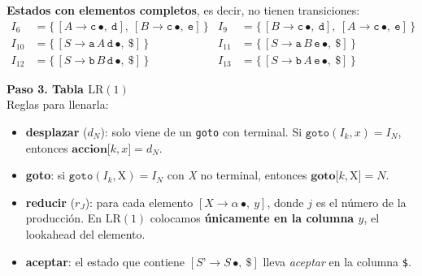 \documentclass[12pt,letterpaper]{article}
\newcommand{\nt}[1]{\textit{#1}}
\newcommand{\tk}[1]{\texttt{#1}}
\newcommand{\tx}[1]{\text{#1}}
\newcommand{\lr}{\mathrm{LR(1)}}
\begin{document}
\begin{enumerate}[label=\arabic*.]
  \medskip

  \textbf{Estados con elementos completos}, es decir, no tienen transiciones:
  \[
  \begin{aligned}
    I_6 &= \{\,[\nt{A}\to\tk{c}\,\bullet,\ \tk{d}],\ [\nt{B}\to\tk{c}\,\bullet,\ \tk{e}]\,\} &
    I_9 &= \{\,[\nt{B}\to\tk{c}\,\bullet,\ \tk{d}],\ [\nt{A}\to\tk{c}\,\bullet,\ \tk{e}]\,\}\\[3pt]
    I_{10} &= \{\,[\nt{S}\to\tk{a}\,\nt{A}\,\tk{d}\,\bullet,\ \tk{\$}]\,\} &
    I_{11} &= \{\,[\nt{S}\to\tk{a}\,\nt{B}\,\tk{e}\,\bullet,\ \tk{\$}]\,\}\\[3pt]
    I_{12} &= \{\,[\nt{S}\to\tk{b}\,\nt{B}\,\tk{d}\,\bullet,\ \tk{\$}]\,\} &
    I_{13} &= \{\,[\nt{S}\to\tk{b}\,\nt{A}\,\tk{e}\,\bullet,\ \tk{\$}]\,\}
  \end{aligned}
  \]

  \textbf{Paso 3. Tabla $\lr$}\\
  Reglas para llenarla:
  \begin{itemize}
  \item \textbf{desplazar} ($d_N$): solo viene de un \texttt{goto} con terminal. Si
    $\texttt{goto}(I_k,x) = I_N$, entonces $\textbf{accion}\tk{[} k, x \tk{]} = d_N$.
    
  \item \textbf{goto}: si $\texttt{goto}(I_k, \tx{X}) = I_N$ con \nt{X} no terminal, entonces
    $\textbf{goto} \tk{[} k, \tx{X} \tk{]} = N$.
    
  \item \textbf{reducir} ($r_J$): para cada elemento $[\nt{X}\to\alpha\,\bullet,\ y]$, donde $j$ es el
    número de la producción. En $\lr$ colocamos \textbf{únicamente en la columna $y$}, el lookahead del elemento.
    
  \item \textbf{aceptar}: el estado que contiene $[\nt{S'}\to\nt{S}\,\bullet,\ \tk{\$}]$ lleva \textit{aceptar}
    en la columna \tk{\$}.
  \end{itemize}


\end{enumerate}
\end{document}
